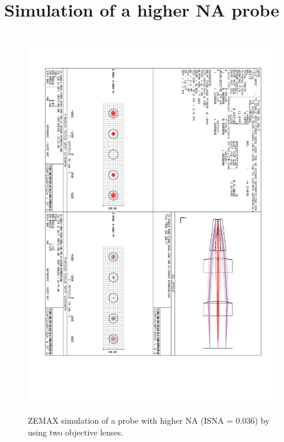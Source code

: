 \clearpage
\section{Simulation of a higher NA probe}
\begin{figure}[h!]\centering \includegraphics[height=17cm,angle=90,origin=c]{appendix/ZEMAXhigh.pdf}
      \caption{ZEMAX simulation of a probe with higher NA (ISNA = 0.036) by using two objective lenses.}
\end{figure}
